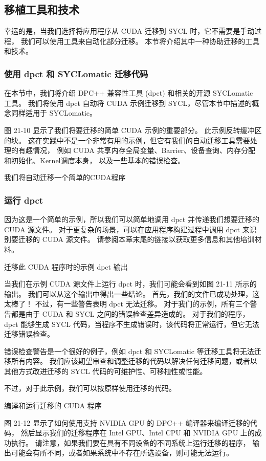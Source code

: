 \subsection{移植工具和技术}
幸运的是，当我们选择将应用程序从 CUDA 迁移到 SYCL 时，它不需要是手动过程，
我们可以使用工具来自动化部分迁移。 本节将介绍其中一种协助迁移的工具和技术。

\subsubsection{使用 dpct 和 SYCLomatic 迁移代码}
在本节中，我们将介绍 DPC++ 兼容性工具 (dpct) 和相关的开源 SYCLomatic 工具。 
我们将使用 dpct 自动将 CUDA 示例迁移到 SYCL，尽管本节中描述的概念同样适用于 SYCLomatic。

图 21-10 显示了我们将要迁移的简单 CUDA 示例的重要部分。 此示例反转缓冲区的块。 
这在实践中不是一个非常有用的示例，但它有我们的自动迁移工具需要处理的有趣情况，
例如 CUDA 共享内存全局变量、Barrier、设备查询、内存分配和初始化、Kernel调度本身， 以及一些基本的错误检查。

{\color{red} 我们将自动迁移一个简单的CUDA程序}

\subsubsection{运行 dpct}

因为这是一个简单的示例，所以我们可以简单地调用 dpct 并传递我们想要迁移的 CUDA 源文件。 
对于更复杂的场景，可以在应用程序构建过程中调用 dpct 来识别要迁移的 CUDA 源文件。 
请参阅本章末尾的链接以获取更多信息和其他培训材料。

{\color{red} 迁移此 CUDA 程序时的示例 dpct 输出}

当我们在示例 CUDA 源文件上运行 dpct 时，我们可能会看到如图 21-11 所示的输出。 
我们可以从这个输出中得出一些结论。 首先，我们的文件已成功处理，这太棒了！ 不过，有一些警告表明 dpct 无法迁移。 
对于我们的示例，所有三个警告都是由于 CUDA 和 SYCL 之间的错误检查差异造成的。 
对于我们的程序，dpct 能够生成 SYCL 代码，当程序不生成错误时，该代码将正常运行，但它无法迁移错误检查。

错误检查警告是一个很好的例子，例如 dpct 和 SYCLomatic 等迁移工具将无法迁移所有内容。 
我们应该期望审查和调整迁移的代码以解决任何迁移问题，或者以其他方式改进迁移的 SYCL 代码的可维护性、可移植性或性能。

不过，对于此示例，我们可以按原样使用迁移的代码。

{\color{red} 编译和运行迁移的 CUDA 程序}

图 21-12 显示了如何使用支持 NVIDIA GPU 的 DPC++ 编译器来编译迁移的代码，
然后显示我们的迁移程序在 Intel GPU、Intel CPU 和 NVIDIA GPU 上的成功执行。 
请注意，如果我们要在具有不同设备的不同系统上运行迁移的程序，
输出可能会有所不同，或者如果系统中不存在所选设备，则可能无法运行。

